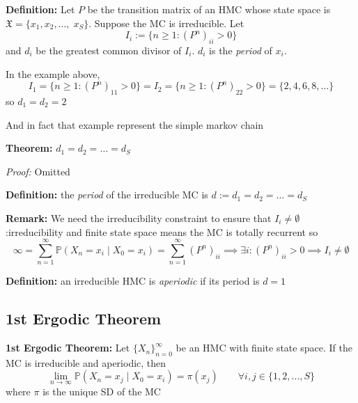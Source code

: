 \documentclass[12pt]{article}
\renewcommand{\P}{\mathbb{P}}
\newcommand{\mfX}{\mathfrak{X}}
\begin{document}
        \textbf{Definition:} Let $P$ be the transition matrix of an HMC whose state space is $\mfX = \{x_1, x_2, \dots,\; x_S\}$. Suppose the MC is irreducible. Let 
        \[I_i := \{n \geq 1: (P^n)_{ii} > 0\}\]
        and $d_i$ be the greatest common divisor of $I_i$. $d_i$ is the \emph{period} of $x_i$.


        In the example above, 
        \[I_1 = \{n \geq 1: (P^n)_{11} > 0\} = I_2 =  \{n \geq 1: (P^n)_{22} > 0\} = \{2, 4, 6, 8, \dots\}\]
        so $d_1 = d_2 = 2$

        And in fact that example represent the simple markov chain 
        \begin{center}
        \end{center}

        \textbf{Theorem:} $d_1 = d_2 = \dots = d_S$ 

        \emph{Proof:} Omitted

        \textbf{Definition:} the \emph{period} of the irreducible MC is $d:= d_1 = d_2 = \dots = d_S$

        \textbf{Remark:} We need the irreducibility constraint to ensure that $I_i \neq \emptyset$:irreducibility and finite state space means the MC is totally recurrent so 
        \[\infty = \sum_{n=1}^\infty \P(X_n = x_i \; | \; X_0 = x_i) = \sum_{n=1}^\infty (P^n)_{ii} \implies \exists i: (P^n)_{ii} > 0 \implies I_i \neq \emptyset\]

        \textbf{Definition:} an irreducible HMC is \emph{aperiodic} if its period is $d= 1$

    \subsection{1st Ergodic Theorem}
        \textbf{1st Ergodic Theorem:} Let $\{X_n\}_{n=0}^\infty$ be an HMC with finite state space. If the MC is irreducible and aperiodic, then 
            \[\lim_{n\to \infty} \P(X_n = x_j \; | \; X_0 = x_i) = \pi(x_j) \qquad \forall i, j \in \{1, 2, \dots, S\}\]
        where $\pi$ is the unique SD of the MC 
\end{document}
